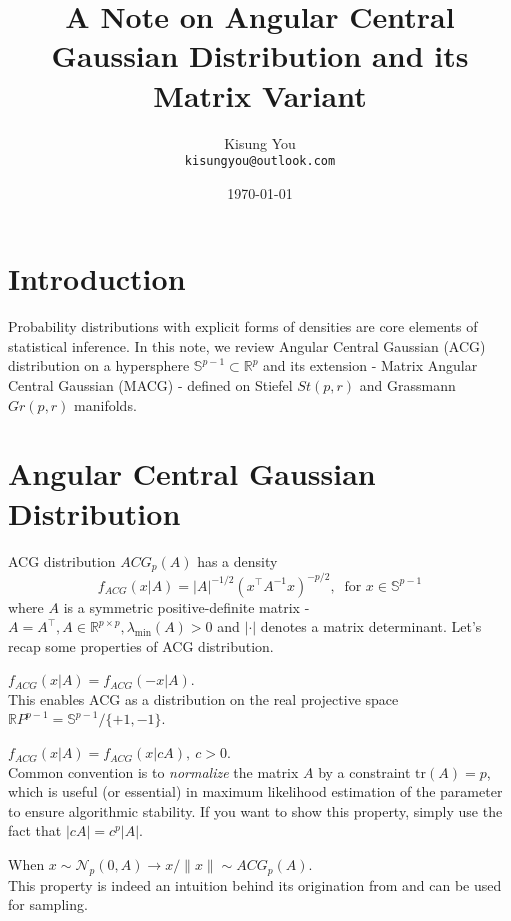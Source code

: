 \documentclass[fontsize=12pt]{article}
\title{A Note on Angular Central Gaussian Distribution and its Matrix Variant}
\author{
	Kisung You\\
	\texttt{kisungyou@outlook.com}
}
\date{\today}
\begin{document}
\maketitle


\section{Introduction}
Probability distributions with explicit forms of densities are 
core elements of statistical inference. In this note, we review 
Angular Central Gaussian (ACG) distribution on a hypersphere $\mathbb{S}^{p-1} \subset \mathbb{R}^{p}$ and its extension - Matrix Angular Central Gaussian (MACG) - defined on 
Stiefel $St(p,r)$ and Grassmann $Gr(p,r)$ manifolds.


\section{Angular Central Gaussian Distribution}

ACG distribution $ACG_p (A)$ has a density 
\begin{equation*}
	f_{ACG}(x\vert A) = |A|^{-1/2} (x^\top A^{-1} x)^{-p/2},~\text{ for } x \in \mathbb{S}^{p-1}
\end{equation*}
where $A$ is a symmetric positive-definite matrix - $A=A^\top, A\in \mathbb{R}^{p\times p}, \lambda_{\text{min}}(A) > 0$ and $|\cdot|$ denotes a matrix determinant. Let's recap some properties of ACG distribution.

\begin{Properties}
	\item $f_{ACG}(x\vert A) = f_{ACG}(-x\vert A)$. \\
	This enables ACG as a distribution on the real projective space $\mathbb{R}P^{p-1} = \mathbb{S}^{p-1}/\lbrace +1, -1 \rbrace$.
	\item $f_{ACG}(x\vert A) = f_{ACG}(x\vert cA),~c > 0$. \\
	Common convention is to \textit{normalize} the matrix $A$ by a constraint $\text{tr}(A) = p$, which is useful (or essential) in maximum likelihood estimation of the parameter to ensure algorithmic stability. If you want to show this property, simply use the fact that $|cA| = c^p |A|$. 
	\item When $x \sim \mathcal{N}_p (0, A) \rightarrow x/\|x\| \sim ACG_p (A)$.\\
	This property is indeed an intuition behind its origination from \cite{tyler_statistical_1987} and can be used for sampling. 
\end{Properties}
\end{document}
